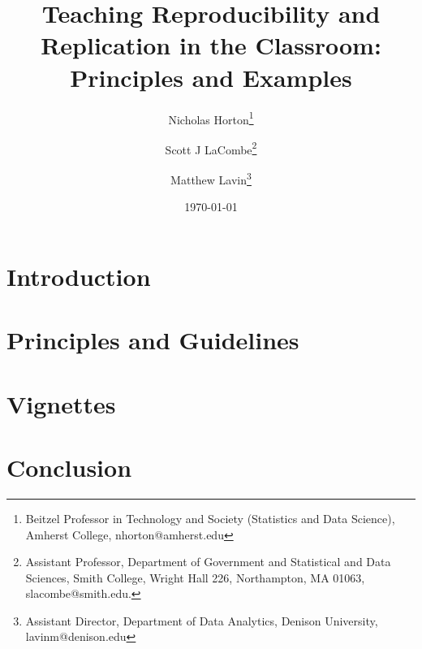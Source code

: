 \documentclass{article}
\title{Teaching Reproducibility and Replication in the Classroom: Principles and Examples}
\author{Nicholas Horton\thanks{Beitzel Professor in Technology and Society (Statistics and Data Science), Amherst College, nhorton@amherst.edu} \and
Scott J LaCombe\thanks{Assistant Professor, Department of Government and Statistical and Data Sciences, Smith College, Wright Hall 226, Northampton, MA 01063, slacombe@smith.edu.} \and 
Matthew Lavin\thanks{Assistant Director, Department of Data Analytics, Denison University, lavinm@denison.edu}}
\date{\today}
\begin{document}
\maketitle
\newpage
\section{Introduction}


\section{Principles and Guidelines}


\section{Vignettes}



\section{Conclusion}
\end{document}
